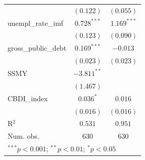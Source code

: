 \begin{table} [h]
{{\begin{tabular}{l c c}
                    & $(0.122)$      & $(0.055)$      \\
unempl\_rate\_imf   & $0.728^{***}$  & $1.169^{***}$  \\
                    & $(0.123)$      & $(0.090)$      \\
gross\_public\_debt & $0.169^{***}$  & $-0.013$       \\
                    & $(0.023)$      & $(0.023)$      \\
SSMY                & $-3.811^{**}$  &                \\
                    & $(1.467)$      &                \\
CBDI\_index         & $0.036^{*}$    & $0.016$        \\
                    & $(0.016)$      & $(0.016)$      \\
\hline
R$^2$               & $0.531$        & $0.951$        \\
Num. obs.           & $630$          & $630$          \\
\hline
\multicolumn{3}{l}{\scriptsize{$^{***}p<0.001$; $^{**}p<0.01$; $^{*}p<0.05$}}
\end{tabular}}

}

\end{table}
